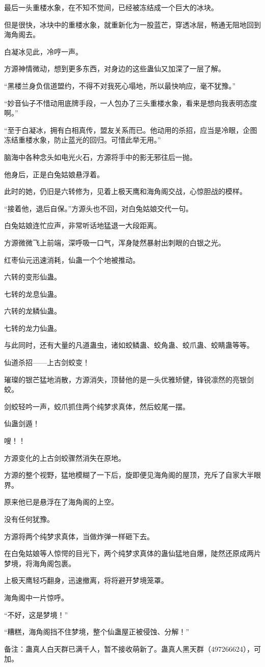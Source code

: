 \begin{this_body}
最后一头重楼水象，在不知不觉间，已经被冻结成一个巨大的冰块。

但是很快，冰块中的重楼水象，就重新化为一股蓝芒，穿透冰层，畅通无阻地回到海角阁去。

白凝冰见此，冷哼一声。

方源神情微动，想到更多东西，对身边的这些蛊仙又加深了一层了解。

“黑楼兰身负信道盟约，不得不对我死心塌地，所以最快响应，毫不犹豫。”

“妙音仙子不惜动用底牌手段，一人包办了三头重楼水象，看来是想向我表明态度啊。”

“至于白凝冰，拥有白相真传，盟友关系而已。他动用的杀招，应当是冷眼，企图冻结重楼水象，防止蓝光的回归。可惜此举无用。”

脑海中各种念头如电光火石，方源将手中的影无邪往后一抛。

他身后，正是白兔姑娘悬浮着。

此时的她，仍旧是六转修为，见着上极天鹰和海角阁交战，心惊胆战的模样。

“接着他，退后自保。”方源头也不回，对白兔姑娘交代一句。

白兔姑娘连忙应声，非常听话地猛退一大段距离。

方源微微飞上前端，深呼吸一口气，浑身陡然暴射出刺眼的白银之光。

红枣仙元迅速消耗，仙蛊一个个地被推动。

六转的变形仙蛊。

七转的龙息仙蛊。

六转的龙鳞仙蛊。

七转的龙力仙蛊。

与此同时，还有大量的凡道蛊虫，诸如蛟鳞蛊、蛟角蛊、蛟爪蛊、蛟睛蛊等等。

仙道杀招——上古剑蛟变！

璀璨的银芒猛地消散，方源消失，顶替他的是一头优雅矫健，锋锐凛然的亮银剑蛟。

剑蛟轻吟一声，蛟爪抓住两个纯梦求真体，然后蛟尾一摆。

仙蛊剑遁！

嗖！！

方源变化的上古剑蛟骤然消失在原地。

方源的整个视野，猛地模糊了一下后，旋即便见海角阁的屋顶，充斥了自家大半眼界。

原来他已是悬浮在了海角阁的上空。

没有任何犹豫。

方源将两个纯梦求真体，当做炸弹一样砸下去。

在白兔姑娘等人惊愕的目光下，两个纯梦求真体的蛊仙猛地自爆，陡然还原成两片梦境，将海角阁包裹。

上极天鹰轻巧翻身，迅速撤离，将将避开梦境笼罩。

海角阁中一片惊呼。

“不好，这是梦境！”

“糟糕，海角阁挡不住梦境，整个仙蛊屋正被侵蚀、分解！”

备注：蛊真人白天群已满千人，暂不接收萌新了。蛊真人黑天群（497266624），可加。

\end{this_body}

